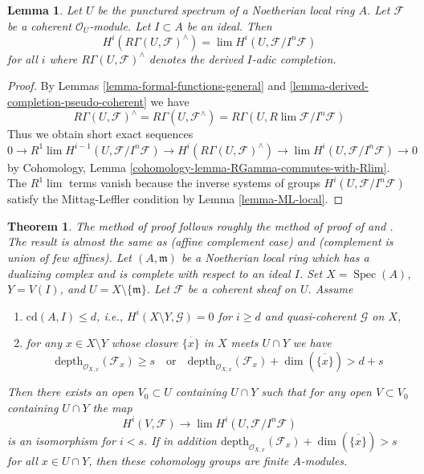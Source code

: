 \documentclass{stacks-project}
\newenvironment{reference}{\comment}{\endcomment}
\theoremstyle{plain}
\newtheorem{theorem}[subsection]{Theorem}
\newtheorem{lemma}[subsection]{Lemma}
\theoremstyle{definition}
\theoremstyle{remark}
\numberwithin{equation}{subsection}
\def\lim{\mathop{\mathrm{lim}}\nolimits}
\def\Spec{\mathop{\mathrm{Spec}}}
\begin{document}
\begin{lemma}
\label{lemma-compare-with-derived-completion}
Let $U$ be the punctured spectrum of a Noetherian local ring $A$.
Let $\mathcal{F}$ be a coherent $\mathcal{O}_U$-module.
Let $I \subset A$ be an ideal. Then
$$
H^i(R\Gamma(U, \mathcal{F})^\wedge) =
\lim H^i(U, \mathcal{F}/I^n\mathcal{F})
$$
for all $i$ where $R\Gamma(U, \mathcal{F})^\wedge$ denotes
the derived $I$-adic completion.
\end{lemma}

\begin{proof}
By Lemmas \ref{lemma-formal-functions-general} and
\ref{lemma-derived-completion-pseudo-coherent} we have
$$
R\Gamma(U, \mathcal{F})^\wedge =
R\Gamma(U, \mathcal{F}^\wedge) =
R\Gamma(U, R\lim \mathcal{F}/I^n\mathcal{F})
$$
Thus we obtain short exact sequences
$$
0 \to R^1\lim H^{i - 1}(U, \mathcal{F}/I^n\mathcal{F}) \to
H^i(R\Gamma(U, \mathcal{F})^\wedge) \to
\lim H^i(U, \mathcal{F}/I^n\mathcal{F}) \to 0
$$
by Cohomology, Lemma \ref{cohomology-lemma-RGamma-commutes-with-Rlim}.
The $R^1\lim$ terms vanish because the inverse systems of groups
$H^i(U, \mathcal{F}/I^n\mathcal{F})$ satisfy the Mittag-Leffler condition
by Lemma \ref{lemma-ML-local}.
\end{proof}

\begin{theorem}
\label{theorem-algebraization-formal-sections}
\begin{reference}
The method of proof follows roughly the method of
proof of \cite[Theorem 1]{Faltings-algebraisation}
and \cite[Satz 2]{Faltings-uber}.
The result is almost the same as
\cite[Theorem 1.1]{MRaynaud-paper} (affine complement case) and
\cite[Theorem 3.9]{MRaynaud-book} (complement is union of few affines).
\end{reference}
Let $(A, \mathfrak m)$ be a Noetherian local ring which has a
dualizing complex and is complete with respect to an ideal $I$.
Set $X = \Spec(A)$, $Y = V(I)$, and $U = X \setminus \{\mathfrak m\}$.
Let $\mathcal{F}$ be a coherent sheaf on $U$.
Assume
\begin{enumerate}
\item $\text{cd}(A, I) \leq d$, i.e.,
$H^i(X \setminus Y, \mathcal{G}) = 0$ for $i \geq d$ and
quasi-coherent $\mathcal{G}$ on $X$,
\item for any $x \in X \setminus Y$ whose closure $\overline{\{x\}}$
in $X$ meets $U \cap Y$ we have
$$
\text{depth}_{\mathcal{O}_{X, x}}(\mathcal{F}_x) \geq s
\quad\text{or}\quad
\text{depth}_{\mathcal{O}_{X, x}}(\mathcal{F}_x)
+ \dim(\overline{\{x\}}) > d + s
$$
\end{enumerate}
Then there exists an open $V_0 \subset U$ containing $U \cap Y$
such that for any open $V \subset V_0$ containing $U \cap Y$
the map
$$
H^i(V, \mathcal{F}) \to \lim H^i(U, \mathcal{F}/I^n\mathcal{F})
$$
is an isomorphism for $i < s$. If in addition
$
\text{depth}_{\mathcal{O}_{X, x}}(\mathcal{F}_x) +
\dim(\overline{\{x\}}) > s
$
for all $x \in U \cap Y$, then these cohomology groups are finite $A$-modules.
\end{theorem}
\end{document}
